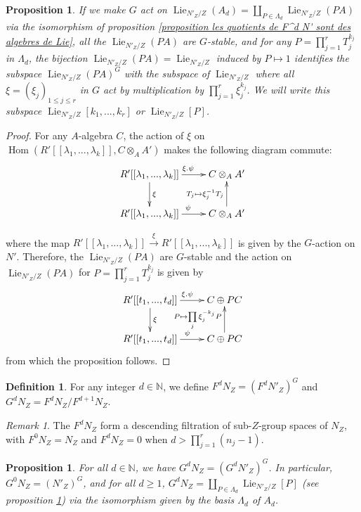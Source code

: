 \documentclass{article}
\newcommand{\N}{\mathbb{N}}
\DeclareMathOperator{\Hom}{Hom}
\DeclareMathOperator{\lie}{Lie}
\newtheorem{prop}[thm]{Proposition}
\theoremstyle{definition}
\newtheorem{defi}[thm]{Definition}
\theoremstyle{remark}
\newtheorem{rem}{Remark}[thm]
\begin{document}
\begin{prop}\label{proposition G-action and invariants of the Lie algebras}
If we make $G$ act on $\lie_{N'_Z/Z}(A_d)=\coprod\limits_{P\in\Lambda_d}\lie_{N'_Z/Z}(PA)$ via the isomorphism of proposition \ref{proposition les quotients de F^d N' sont des algebres de Lie}, all the $\lie_{N'_Z/Z}(PA)$ are $G$-stable, and for any $P=\prod\limits_{j=1}^r T_{j}^{k_j}$ in $\Lambda_d$, the bijection $\lie_{N'_Z/Z}(PA)=\lie_{N'_Z/Z}$ induced by $P\mapsto 1$ identifies the subspace $\lie_{N'_Z/Z}(PA)^G$ with the subspace of $\lie_{N'_Z/Z}$ where all $\xi=(\xi_j)_{1\leq j\leq r}$ in $G$ act by multiplication by $\prod\limits_{j=1}^r \xi_j^{k_j}$. We will write this subspace $\lie_{N'_Z/Z}[k_1,...,k_r]$ or $\lie_{N'_Z/Z}[P]$.
\end{prop}

\begin{proof}
For any $A$-algebra $C$, the action of $\xi$ on $\Hom(R'[[\lambda_1,...,\lambda_k]],C\otimes_A A')$ makes the following diagram commute:
\[
\xymatrix{
R'[[\lambda_1,...,\lambda_k]]\ar[d]^{\xi}\ar[r]^{\xi.\psi}&C\otimes_A A'\\
R'[[\lambda_1,...,\lambda_k]]\ar[r]^{\psi}&C\otimes_A A'\ar[u]^{T_j\mapsto\xi_j^{-1}T_j}
}
\]

where the map $R'[[\lambda_1,...,\lambda_k]]\xrightarrow{\xi} R'[[\lambda_1,...,\lambda_k]]$ is given by the $G$-action on $N'$. Therefore, the $\lie_{N'_Z/Z}(PA)$ are $G$-stable and the action on $\lie_{N'_Z/Z}(PA)$ for $P=\prod\limits_{j=1}^r T_{j}^{k_j}$ is given by
\[
\xymatrix{
R'[[t_1,...,t_d]]\ar[d]^{\xi}\ar[r]^{\xi.\psi} &C\oplus PC\\
R'[[t_1,...,t_d]]\ar[r]^{\psi} &C\oplus PC\ar[u]^{P\mapsto\prod\limits_j\xi_j^{-k_j} P}
}
\]
from which the proposition follows.
\end{proof}


\begin{defi}\label{definition F^d N}
For any integer $d\in\N$, we define $F^d N_Z=(F^d N'_Z)^G$ and $G^d N_Z=F^d N_Z/F^{d+1}N_Z$.
\end{defi}

\begin{rem}
The $F^d N_Z$ form a descending filtration of sub-$Z$-group spaces of $N_Z$, with $F^0 N_Z=N_Z$ and $F^d N_Z=0$ when $d>\prod\limits_{j=1}^r (n_j-1)$.
\end{rem}

\begin{prop}
For all $d\in\N$, we have $G^d N_Z=(G^d N'_Z)^G$. In particular, $G^0 N_Z=(N'_Z)^G$, and for all $d\geq 1$,  $G^d N_Z=\coprod_{P\in\Lambda_d}\lie_{N'_Z/Z}[P]$ (see proposition \ref{proposition G-action and invariants of the Lie algebras}) via the isomorphism given by the basis $\Lambda_d$ of $A_d$.
\end{prop}
\end{document}
